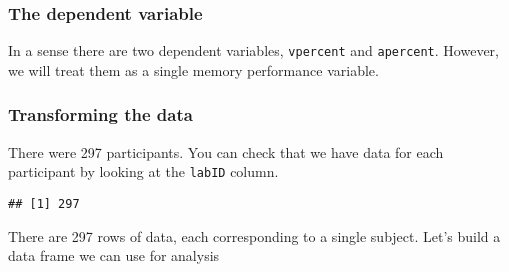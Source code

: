 \documentclass[
]{book}
\newenvironment{Shaded}{\begin{snugshade}}{\end{snugshade}}
\newcommand{\AttributeTok}[1]{\textcolor[rgb]{0.13,0.29,0.53}{#1}}
\newcommand{\DecValTok}[1]{\textcolor[rgb]{0.00,0.00,0.81}{#1}}
\newcommand{\FunctionTok}[1]{\textcolor[rgb]{0.13,0.29,0.53}{\textbf{#1}}}
\newcommand{\NormalTok}[1]{#1}
\newcommand{\OtherTok}[1]{\textcolor[rgb]{0.56,0.35,0.01}{#1}}
\newcommand{\SpecialCharTok}[1]{\textcolor[rgb]{0.81,0.36,0.00}{\textbf{#1}}}
\newcommand{\StringTok}[1]{\textcolor[rgb]{0.31,0.60,0.02}{#1}}
\begin{document}
\hypertarget{the-dependent-variable-1}{%
\subsubsection{The dependent variable}\label{the-dependent-variable-1}}

In a sense there are two dependent variables, \texttt{vpercent} and \texttt{apercent}.
However, we will treat them as a single memory performance variable.

\hypertarget{transforming-the-data}{%
\subsubsection{Transforming the data}\label{transforming-the-data}}

There were 297 participants. You can check that we have data for each
participant by looking at the \texttt{labID} column.

\begin{Shaded}
\end{Shaded}

\begin{verbatim}
## [1] 297
\end{verbatim}

There are 297 rows of data, each corresponding to a single subject.
Let's build a data frame we can use for analysis

\begin{Shaded}
\end{Shaded}
\end{document}
